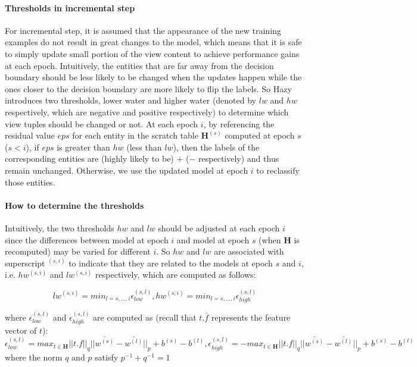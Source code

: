 \paragraph{Thresholds in incremental step}
For incremental step, it is assumed that the appearance of the new training examples do not result in great changes to the model, which means that it is safe to simply update small portion of the view content to achieve performance gains at each epoch. Intuitively, the entities that are far away from the decision boundary should be less likely to be changed when the updates happen while the ones closer to the decision boundary are more likely to flip the labels. So Hazy introduces two thresholds, lower water and higher water (denoted by $lw$ and $hw$ respectively, which are negative and positive respectively) to determine which view tuples should be changed or not. At each epoch $i$, by referencing the residual value $eps$ for each entity in the scratch table $\textbf{H}^{(s)}$ computed at epoch $s$ ($s<i$), if $eps$ is greater than $hw$ (less than $lw$), then the labels of the corresponding entities are (highly likely to be) $+$ ($-$ respectively) and thus remain unchanged. Otherwise, we use the updated model at epoch $i$ to reclassify those entities. 

\paragraph{How to determine the thresholds}
Intuitively, the two thresholds $hw$ and $lw$ should be adjusted at each epoch $i$ since the differences between model at epoch $i$ and model at epoch $s$ (when $\textbf{H}$ is recomputed) may be varied for different $i$. So $hw$ and $lw$ are associated with superscript $^{(s,i)}$ to indicate that they are related to the models at epoch $s$ and $i$, i.e. $hw^{(s,i)}$ and $lw^{(s,i)}$ respectively, which are computed as follows:

\begin{equation}
    lw^{(s,i)} = min_{l=s,\dots, i}\epsilon_{low}^{(s,l)},
    hw^{(s,i)} = min_{l=s,\dots, i}\epsilon_{high}^{(s,l)}
\end{equation}

where $\epsilon_{low}^{(s,l)}$ and $\epsilon_{high}^{(s,l)}$ are computed as (recall that $t.\bar{f}$ represents the feature vector of $t$):
\begin{equation}
    \epsilon_{low}^{(s,l)} = max_{t \in \textbf{H}}||t.f||_q||\bar{w^{(s)}}-\bar{w^{(l)}}||_p+b^{(s)}-b^{(l)}, \epsilon_{high}^{(s,l)} = - max_{t \in \textbf{H}}||t.f||_q||\bar{w^{(s)}}-\bar{w^{(l)}}||_p+b^{(s)}-b^{(l)}
\end{equation}
where the norm $q$ and $p$ satisfy $p^{-1} + q^{-1} = 1$


